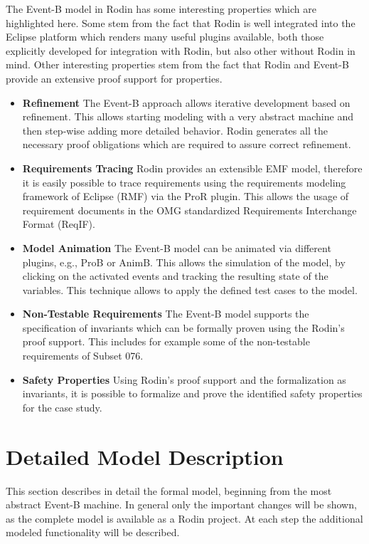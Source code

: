 \documentclass[10pt,a4paper]{article}
\begin{document}
The Event-B model in Rodin has some interesting properties which are highlighted
here. Some stem from the fact that Rodin is well integrated into the Eclipse
platform which renders many useful plugins available, both those explicitly
developed for integration with Rodin, but also other without Rodin in mind.
Other interesting properties stem from the fact that Rodin and Event-B provide
an extensive proof support for properties.

\begin{itemize}
\item {\bf Refinement} The Event-B approach allows iterative development based
  on refinement. This allows starting modeling with a very abstract machine and
  then step-wise adding more detailed behavior. Rodin generates all the
  necessary proof obligations which are required to assure correct refinement.
\item {\bf Requirements Tracing} Rodin provides an extensible EMF model,
  therefore it is easily possible to trace requirements using the requirements
  modeling framework of Eclipse (RMF) via the ProR plugin. This allows the usage
  of requirement documents in the OMG standardized Requirements Interchange
  Format (ReqIF).
\item {\bf Model Animation} The Event-B model can be animated via different
  plugins, e.g., ProB or AnimB. This allows the simulation of the model, by
  clicking on the activated events and tracking the resulting state of the
  variables. This technique allows to apply the defined test cases to the model.
\item {\bf Non-Testable Requirements} The Event-B model supports the
  specification of invariants which can be formally proven using the Rodin's
  proof support. This includes for example some of the non-testable requirements
  of Subset 076.
\item {\bf Safety Properties} Using Rodin's proof support and the formalization
  as invariants, it is possible to formalize and prove the identified safety
  properties for the case study.
\end{itemize}

\section{Detailed Model Description}
\label{sec:deta-model-descr}

This section describes in detail the formal model, beginning from the most
abstract Event-B machine. In general only the important changes will be shown,
as the complete model is available as a Rodin project. At each step the
additional modeled functionality will be described.
\end{document}
